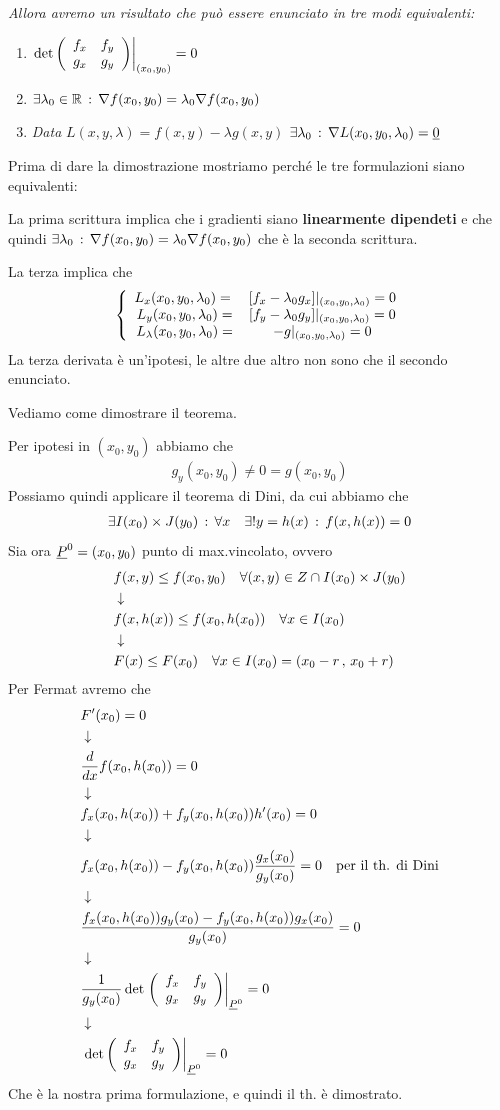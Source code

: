 \textit{Allora avremo un risultato che può essere enunciato in tre modi equivalenti:}
\begin{enumerate}
	\item $\left. \det \left( \begin{array}{ccc} f_x & f_y \\ g_x & g_y \end{array} \right)\right|_{(x_0,y_0)} = 0$
	\item $\exists \lambda_0 \in \mathbb{R} \, : \, \nabla f(x_0,y_0)= \lambda_0 \nabla f(x_0,y_0)$
	\item \textit{Data }$L(x,y,\lambda)= f(x,y) - \lambda g(x,y)$ $\exists \lambda_0 \, : \, \nabla L(x_0,y_0, \lambda_0)=\underline{0}$ 
\end{enumerate}

Prima di dare la dimostrazione mostriamo perché le tre formulazioni siano equivalenti:

La prima scrittura implica che i gradienti siano \textbf{linearmente dipendeti} e che quindi $\exists \lambda_0 \, : \, \nabla f(x_0,y_0)= \lambda_0 \nabla f(x_0,y_0)$ che è la seconda scrittura.

La terza implica che
\begin{align}
	\left\{\begin{array}{cc} L_x(x_0,y_0, \lambda_0) = {}&[f_x - \lambda_0 g_x]|_{(x_0,y_0, \lambda_0)}=0 \\ L_y(x_0,y_0, \lambda_0) = &[f_y - \lambda_0 g_y]|_{(x_0,y_0, \lambda_0)}=0 \\ L_\lambda(x_0,y_0, \lambda_0) = &-g|_{(x_0,y_0, \lambda_0)}=0 \end{array}\right.
\end{align}
La terza derivata è un'ipotesi, le altre due altro non sono che il secondo enunciato.

Vediamo come dimostrare il teorema.

Per ipotesi in $(x_0,y_0)$ abbiamo che
\begin{align}
	g_y(x_0,y_0) \neq 0 = g(x_0,y_0)
\end{align}
Possiamo quindi applicare il teorema di Dini, da cui abbiamo che
\begin{align}
	\exists I(x_0)\times J(y_0) \, : \, \forall x \quad \exists ! y=h(x) \, : \, f(x,h(x))=0
\end{align}
Sia ora $\underline{P}^0=(x_0,y_0)$ punto di max.vincolato, ovvero
\begin{align}
	{}&f(x,y)\leq f(x_0,y_0) \quad \forall (x,y)\in Z\cap  I(x_0)\times J(y_0) \nonumber \\ &\downarrow \nonumber \\
	& f(x,h(x)) \leq f(x_0,h(x_0)) \quad \forall x\in I(x_0) \nonumber \\ &\downarrow \nonumber \\
	& F(x)\leq F(x_0)  \quad \forall x\in I(x_0)= (x_0 - r \, , \, x_0 + r)
\end{align}
Per Fermat avremo che
\begin{align}
	{}&F'(x_0)=0 \nonumber \\ &\downarrow \nonumber \\
	&\frac{d }{d x}f(x_0,h(x_0))=0\nonumber \\ &\downarrow \nonumber \\						&f_x(x_0,h(x_0)) + f_y(x_0,h(x_0))h'(x_0)=0\nonumber \\ &\downarrow \nonumber \\
	&f_x(x_0,h(x_0)) - f_y(x_0,h(x_0))\frac{g_x(x_0)}{g_y(x_0)}=0  \quad\text{per il th. di Dini} \nonumber \\ &\downarrow \nonumber \\
	& \frac{f_x(x_0,h(x_0))g_y(x_0) - f_y(x_0,h(x_0))g_x(x_0)}{g_y(x_0)}=0 \nonumber \\ &\downarrow \nonumber \\
	&\frac{1}{g_y(x_0)} \det \left.\left( \begin{array}{ccc} f_x & f_y \\ g_x & g_y \end{array} \right)\right|_{\underline{P}^0}=0 \nonumber \\ &\downarrow \nonumber \\
	& \left.\det\left( \begin{array}{ccc} f_x & f_y \\ g_x & g_y \end{array} \right)\right|_{\underline{P}^0}=0
\end{align}
Che è la nostra prima formulazione, e quindi il th. è dimostrato.


